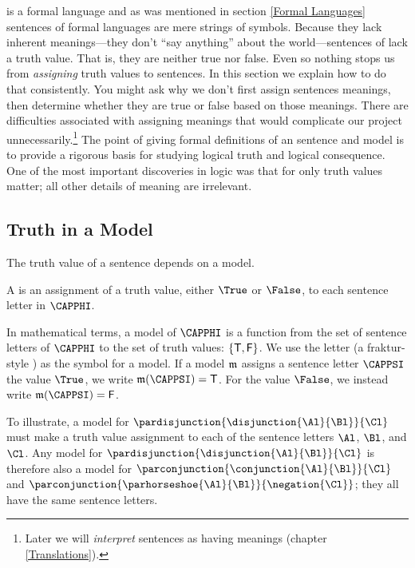 \GSL{} is a formal language and as was mentioned in section \ref{Formal Languages} sentences of formal languages are mere strings of symbols.
Because they lack inherent meanings---they don't ``say anything'' about the world---sentences of \GSL{} lack a truth value. That is, they are neither true nor false. 
Even so nothing stops us from \emph{assigning} truth values to \GSL{} sentences. 
In this section we explain how to do that consistently. 
You might ask why we don't first assign \GSL{} sentences meanings, then determine whether they are true or false based on those meanings. 
There are difficulties associated with assigning meanings that would complicate our project unnecessarily.\footnote{Later we will \emph{interpret} \GSL{} sentences as having meanings (chapter \ref{Translations}).} The point of giving formal definitions of an \GSL{} sentence and model is to provide a rigorous basis for studying logical truth and logical consequence. 
One of the most important discoveries in logic was that for \GSL{} only truth values matter; all other details of meaning are irrelevant.

\subsection{Truth in a Model}\label{Truth in an Interpretation} 

The truth value of a sentence depends on a model.

\begin{majorILnc}{}
A  is an assignment of a truth value, either $\True$ or $\False$, to each sentence letter in $\CAPPHI$.
\end{majorILnc}

\noindent{}In mathematical terms, a model of $\CAPPHI$ is a function from the set of sentence letters of $\CAPPHI$ to the set of truth values: $\{\mathsf{T}, \mathsf{F}\}$. 
We use the letter \mention{$\IntA$} (a fraktur-style ) as the symbol for a model. 
If a model $\IntA$ assigns a sentence letter $\CAPPSI$ the value $\True$, we write $\IntA(\CAPPSI)=\TrueB$.
For the value $\False$, we instead write $\IntA(\CAPPSI)=\FalseB$.

To illustrate, a model for $\pardisjunction{\disjunction{\Al}{\Bl}}{\Cl}$ must make a truth value assignment to each of the sentence letters $\Al$, $\Bl$, and $\Cl$.  Any model for $\pardisjunction{\disjunction{\Al}{\Bl}}{\Cl}$ is therefore also a model for $\parconjunction{\conjunction{\Al}{\Bl}}{\Cl}$ and $\parconjunction{\parhorseshoe{\Al}{\Bl}}{\negation{\Cl}}$; they all have the same sentence letters.

